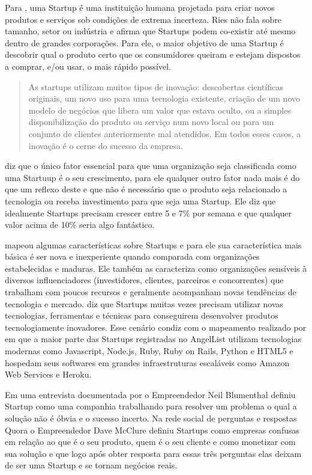 Para , uma Startup é uma instituição humana projetada para criar novos produtos e serviços sob condições de extrema incerteza. Ries não fala sobre tamanho, setor ou indústria e afirma que Startups podem co-existir até mesmo dentro de grandes corporações. Para ele, o maior objetivo de uma Startup é descobrir qual o produto certo que os consumidores queiram e estejam dispostos a comprar, e/ou usar, o mais rápido possível. 

\begin{quote}
As startups utilizam muitos tipos de inovação: descobertas científicas originais, um novo uso para uma tecnologia existente, criação de um novo modelo de negócios que libera um valor que estava oculto, ou a simples disponibilização do produto ou serviço num novo local ou para um conjunto de clientes anteriormente mal atendidos. Em todos esses casos, a inovação é o cerne do sucesso da empresa. \cite{Ries2011}
\end{quote}

 diz que o único fator essencial para que uma organização seja classificada como uma Startuup é o seu crescimento, para ele qualquer outro fator nada mais é do que um reflexo deste e que não é necessário que o produto seja relacionado a tecnologia ou receba investimento para que seja uma Startup. Ele diz que idealmente Startups precisam crescer entre 5 e 7\% por semana e que qualquer valor acima de 10\% seria algo fantástico.

 mapeou algumas características sobre Startups e para ele sua característica mais básica é ser nova e inexperiente quando comparada com organizações estabelecidas e maduras. Ele também as caracteriza como organizações sensíveis à diversos influenciadores (investidores, clientes, parceiros e concorrentes) que trabalham com poucos recursos e geralmente acompanham novas tendências de tecnologia e mercado.  diz que Startups muitas vezes precisam utilizar novas tecnologias, ferramentas e técnicas para conseguirem desenvolver produtos tecnologiamente inovadores. Esse cenário condiz com o mapeamento realizado por  em que a maior parte das Startups registradas no AngelList utilizam tecnologias modernas como Javascript, Node.js, Ruby, Ruby on Rails, Python e HTML5 e hospedam seus softwares em grandes infraestruturas escaláveis como Amazon Web Services e Heroku.

Em uma entrevista documentada por  o Empreendedor Neil Blumenthal definiu Startup como uma companhia trabalhando para resolver um problema o qual a solução não é óbvia e o sucesso incerto. Na rede social de perguntas e respostas Quora o Empreendedor Dave McClure definiu Startups como empresas confusas em relação ao que é o seu produto, quem é o seu cliente e como monetizar com sua solução e que logo após obter resposta para essas três perguntas elas deixam de ser uma Startup e se tornam negócios reais.


